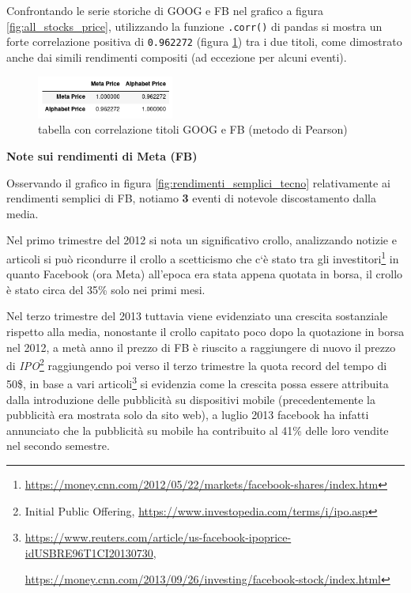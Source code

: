 \documentclass{article}
\begin{document}
Confrontando le serie storiche di GOOG e FB nel grafico a figura \ref{fig:all_stocks_price}, utilizzando la funzione \verb|.corr()| di pandas si mostra un forte correlazione positiva di \verb|0.962272| (figura \ref{fig:corr_tecno})
tra i due titoli, come dimostrato anche dai simili rendimenti compositi (ad eccezione per alcuni eventi).

\begin{figure}[h]
  \centering
  \includegraphics[width=0.4\textwidth]{corr_tecno.png}
  \caption{tabella con correlazione titoli GOOG e FB (metodo di Pearson)}
  \label{fig:corr_tecno}
\end{figure}

\pagebreak

\textbf{Note sui rendimenti di Meta (FB)}

Osservando il grafico in figura \ref{fig:rendimenti_semplici_tecno} relativamente ai rendimenti semplici di FB, notiamo \textbf{3} eventi di notevole discostamento dalla media.

Nel primo trimestre del 2012 si nota un significativo crollo, analizzando notizie e articoli si può ricondurre il crollo a scetticismo che c`è stato
tra gli investitori\footnote{\href{https://money.cnn.com/2012/05/22/markets/facebook-shares/index.htm}{https://money.cnn.com/2012/05/22/markets/facebook-shares/index.htm}} in quanto
Facebook (ora Meta) all'epoca era stata appena quotata in borsa, il crollo è stato circa del 35\% solo nei primi mesi.

Nel terzo trimestre del 2013 tuttavia viene evidenziato una crescita sostanziale rispetto alla media, nonostante il crollo capitato poco dopo la quotazione in borsa nel 2012,
a metà anno il prezzo di FB è riuscito a raggiungere di nuovo il prezzo di \emph{IPO}\footnote{Initial Public Offering, \href{https://www.investopedia.com/terms/i/ipo.asp}{https://www.investopedia.com/terms/i/ipo.asp}}
raggiungendo poi verso il terzo trimestre la quota record del tempo di 50\$, in base a vari 
articoli\footnote{
  \href{https://www.reuters.com/article/us-facebook-ipoprice-idUSBRE96T1CI20130730}{https://www.reuters.com/article/us-facebook-ipoprice-idUSBRE96T1CI20130730},
  
  \hspace{1.5mm} \href{https://money.cnn.com/2013/09/26/investing/facebook-stock/index.html}{https://money.cnn.com/2013/09/26/investing/facebook-stock/index.html}
  }
si evidenzia come la crescita possa essere attribuita dalla introduzione delle pubblicità su dispositivi mobile (precedentemente la pubblicità era mostrata solo da sito web),
a luglio 2013 facebook ha infatti annunciato che la pubblicità su mobile ha contribuito al 41\% delle loro vendite nel secondo semestre.
\end{document}
